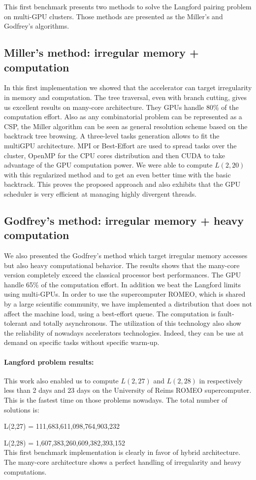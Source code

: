 This first benchmark presents two methods to solve the Langford pairing problem on multi-GPU clusters. 
Those methods are presented as the Miller's and Godfrey's algorithms.

\subsection{Miller's method: irregular memory + computation}
In this first implementation we showed that the accelerator can target irregularity in memory and computation. 
The tree traversal, even with branch cutting, gives us excellent results on many-core architecture.
They GPUs handle 80\% of the computation effort.
Also as any combinatorial problem can be represented as a CSP, the Miller algorithm can be seen as general resolution scheme based on the backtrack tree browsing. 
A three-level tasks generation allows to fit the multiGPU architecture. 
MPI or Best-Effort are used to spread tasks over the cluster, OpenMP for the CPU cores distribution and then CUDA to take advantage of the GPU computation power.
We were able to compute $L(2,20)$ with this regularized method and to get an even better time with the basic backtrack. 
This proves the proposed approach and also exhibits that the GPU scheduler is very efficient at managing highly divergent threads.

\subsection{Godfrey's method: irregular memory + heavy computation}
We also presented the Godfrey's method which target irregular memory accesses but also heavy computational behavior. 
The results shows that the many-core version completely exceed the classical processor best performances. 
The GPU handle 65\% of the computation effort. 
In addition we beat the Langford limits using multi-GPUs. 
In order to use the supercomputer ROMEO, which is shared by a large scientific community, we have implemented a distribution that does not affect the machine load, using a best-effort queue. The computation is fault-tolerant and totally asynchronous.
The utilization of this technology also show the reliability of nowadays accelerators technologies. 
Indeed, they can be use at demand on specific tasks without specific warm-up. 

\paragraph{Langford problem results: }
This work also enabled us to compute $L(2,27)$ and $L(2,28)$ in respectively less than 2 days and 23 days on the University of Reims ROMEO supercomputer. 
This is the fastest time on those problems nowadays.
The total number of solutions is: 

\hspace{3cm} L(2,27) = 111,683,611,098,764,903,232

\hspace{3cm} L(2,28) = 1,607,383,260,609,382,393,152\\

This first benchmark implementation is clearly in favor of hybrid architecture. 
The many-core architecture shows a perfect handling of irregularity and heavy computations. 
